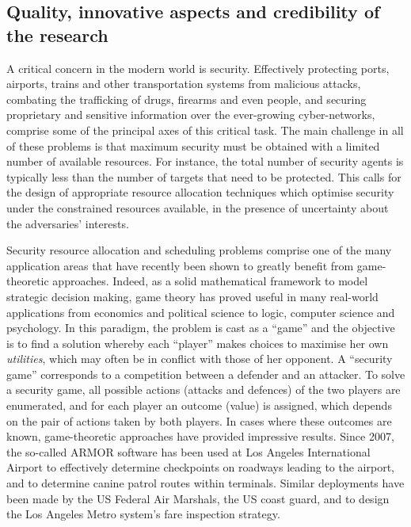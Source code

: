 
\subsection{Quality, innovative aspects and credibility of the research} %
\label{sec:quality}

A critical concern in the modern world is security. Effectively protecting ports, airports, trains and other transportation systems from malicious attacks, combating the trafficking of drugs, firearms and even people, and securing proprietary and sensitive information over the ever-growing cyber-networks, comprise some of the principal axes of this critical task. The main challenge in all of these problems is that maximum security must be obtained with a limited number of available resources. For instance, the total number of security agents is typically less than the number of targets that need to be protected. %
This calls for the design of appropriate resource allocation techniques which optimise security under the constrained resources available, in the presence of uncertainty about the adversaries' interests. %
 
Security resource allocation and scheduling problems comprise one of the many application areas that have recently been shown to greatly benefit from game-theoretic approaches. Indeed, as a solid mathematical framework to model strategic decision making, game theory has proved useful in many real-world applications from economics and political science to logic, computer science and psychology. In this paradigm, the problem is cast as a ``game'' and the objective is to find a solution whereby each ``player'' makes choices to maximise her own \textit{utilities}, which may often be in conflict with those of her opponent. A ``security game'' corresponds to a competition between a defender and an attacker. To solve a security game, all possible actions (attacks and defences) of the two players are enumerated, and for each player an outcome (value) is assigned, which depends on the pair of actions taken by both players. In cases where these outcomes are known, game-theoretic approaches have provided impressive results. Since 2007, the so-called ARMOR software \cite{pita2008deployed} has been used at Los Angeles International Airport to effectively determine checkpoints on roadways leading to the airport, and to determine canine patrol routes within terminals. Similar deployments have been made by the US Federal Air Marshals\cite{tsai2009iris}, the US coast guard\cite{shieh2012protect}, and to design the Los Angeles Metro system's fare inspection strategy\cite{yin2012trusts}. 

